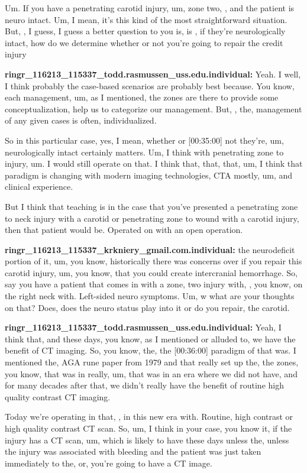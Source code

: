 \documentclass[
]{book}
\begin{document}
Um. If you have a penetrating carotid injury, um, zone two, , and the
patient is neuro intact. Um, I mean, it's this kind of the most
straightforward situation. But, , I guess, I guess a better question to
you is, is , if they're neurologically intact, how do we determine
whether or not you're going to repair the credit injury

\textbf{ringr\_116213\_115337\_todd.rasmussen\_uss.edu.individual:} Yeah. I well,
I think probably the case-based scenarios are probably best because. You
know, each management, um, as I mentioned, the zones are there to
provide some conceptualization, help us to categorize our management.
But, , the, management of any given cases is often, individualized.

So in this particular case, yes, I mean, whether or {[}00:35:00{]} not
they're, um, neurologically intact certainly matters. Um, I think with
penetrating zone to injury, um. I would still operate on that. I think
that, that, that, um, I think that paradigm is changing with modern
imaging technologies, CTA mostly, um, and clinical experience.

But I think that teaching is in the case that you've presented a
penetrating zone to neck injury with a carotid or penetrating zone to
wound with a carotid injury, then that patient would be. Operated on
with an open operation.

\textbf{ringr\_116213\_115337\_krkniery\_gmail.com.individual:} the neurodeficit
portion of it, um, you know, historically there was concerns over if you
repair this carotid injury, um, you know, that you could create
intercranial hemorrhage. So, say you have a patient that comes in with a
zone, two injury with, , you know, on the right neck with. Left-sided
neuro symptoms. Um, w what are your thoughts on that? Does, does the
neuro status play into it or do you repair, the carotid.

\textbf{ringr\_116213\_115337\_todd.rasmussen\_uss.edu.individual:} Yeah, I think
that, and these days, you know, as I mentioned or alluded to, we have
the benefit of CT imaging. So, you know, the, the {[}00:36:00{]} paradigm of
that was. I mentioned the, AGA rune paper from 1979 and that really set
up the, the zones, you know, that was in really, um, that was in an era
where we did not have, and for many decades after that, we didn't really
have the benefit of routine high quality contrast CT imaging.

Today we're operating in that, , in this new era with. Routine, high
contrast or high quality contrast CT scan. So, um, I think in your case,
you know it, if the injury has a CT scan, um, which is likely to have
these days unless the, unless the injury was associated with bleeding
and the patient was just taken immediately to the, or, you're going to
have a CT image.
\end{document}
